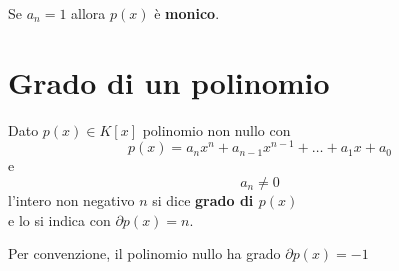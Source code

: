 \documentclass[a4paper,12pt, oneside]{book}
\begin{document}
		\begin{nota}
			Se $a_n = 1$ allora $p(x)$ è \textbf{monico}.
		\end{nota}
		
	\section{Grado di un polinomio}
		\begin{definizione}
			Dato $p(x) \in K[x]$ polinomio non nullo con
			$$p(x) = a_{n}x^{n} + a_{n-1}x^{n-1} + \dots + a_{1}x + a_{0}$$
			e
			$$a_n \not = 0$$
			l'intero non negativo $n$ si dice \textbf{grado di $p(x)$}\\
			e lo si indica con $\partial p(x) = n$.
		\end{definizione}
		\begin{nota}
			Per convenzione, il polinomio nullo ha grado $\partial p(x) = -1$
		\end{nota}
		
\end{document}
